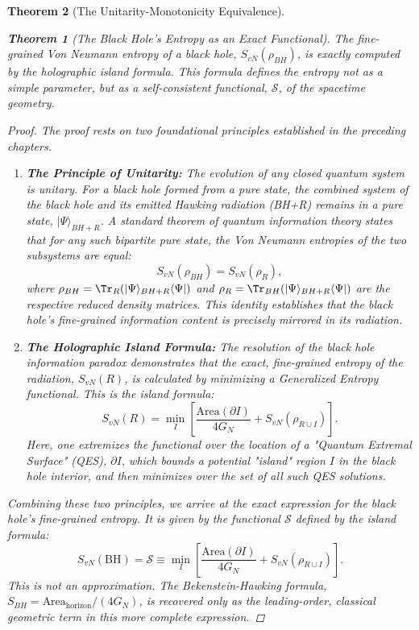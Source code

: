 \documentclass[11pt, letterpaper]{report}
\theoremstyle{plain} %
\newtheorem{theorem}{Theorem}[chapter]
\theoremstyle{definition} %
\theoremstyle{remark} %
\begin{document}
\begin{theorem}[The Unitarity-Monotonicity Equivalence]
\begin{theorem}[The Black Hole's Entropy as an Exact Functional]
\label{thm:bh_entropy_exact}
The fine-grained Von Neumann entropy of a black hole, $S_{vN}(\rho_{BH})$, is exactly computed by the holographic island formula. This formula defines the entropy not as a simple parameter, but as a self-consistent functional, $\mathcal{S}$, of the spacetime geometry.
\end{theorem}
\begin{proof}
The proof rests on two foundational principles established in the preceding chapters.
\begin{enumerate}
    \item \textbf{The Principle of Unitarity:} The evolution of any closed quantum system is unitary. For a black hole formed from a pure state, the combined system of the black hole and its emitted Hawking radiation (BH+R) remains in a pure state, $|\Psi\rangle_{BH+R}$. A standard theorem of quantum information theory states that for any such bipartite pure state, the Von Neumann entropies of the two subsystems are equal:
    \begin{equation}
        S_{vN}(\rho_{BH}) = S_{vN}(\rho_{R}),
    \end{equation}
    where $\rho_{BH} = \Tr_R(|\Psi\rangle_{BH+R}\langle\Psi|)$ and $\rho_R = \Tr_{BH}(|\Psi\rangle_{BH+R}\langle\Psi|)$ are the respective reduced density matrices. This identity establishes that the black hole's fine-grained information content is precisely mirrored in its radiation.

    \item \textbf{The Holographic Island Formula:} The resolution of the black hole information paradox demonstrates that the exact, fine-grained entropy of the radiation, $S_{vN}(R)$, is calculated by minimizing a Generalized Entropy functional. This is the island formula:
    \begin{equation}
        S_{vN}(R) = \min_{I} \left[ \frac{\text{Area}(\partial I)}{4G_N} + S_{vN}(\rho_{R \cup I}) \right].
        \label{eq:island_formula_ch3}
    \end{equation}
    Here, one extremizes the functional over the location of a "Quantum Extremal Surface" (QES), $\partial I$, which bounds a potential "island" region $I$ in the black hole interior, and then minimizes over the set of all such QES solutions.

\end{enumerate}
Combining these two principles, we arrive at the exact expression for the black hole's fine-grained entropy. It is given by the functional $\mathcal{S}$ defined by the island formula:
\begin{equation}
    S_{vN}(\text{BH}) = \mathcal{S} \equiv \min_{I} \left[ \frac{\text{Area}(\partial I)}{4G_N} + S_{vN}(\rho_{R \cup I}) \right].
\end{equation}
This is not an approximation. The Bekenstein-Hawking formula, $S_{BH} = \text{Area}_{\text{horizon}}/(4G_N)$, is recovered only as the leading-order, classical geometric term in this more complete expression.
\end{proof}


\end{theorem}
\end{document}
